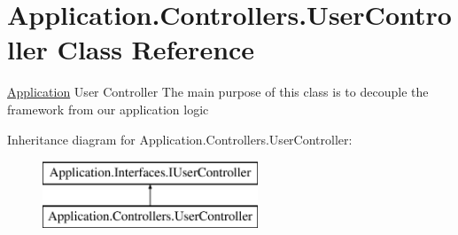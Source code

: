 \hypertarget{class_application_1_1_controllers_1_1_user_controller}{}\section{Application.\+Controllers.\+User\+Controller Class Reference}
\label{class_application_1_1_controllers_1_1_user_controller}


\mbox{\hyperlink{namespace_application}{Application}} User Controller The main purpose of this class is to decouple the framework from our application logic  


Inheritance diagram for Application.\+Controllers.\+User\+Controller\+:\begin{figure}[H]
\begin{center}
\leavevmode
\includegraphics[height=2.000000cm]{class_application_1_1_controllers_1_1_user_controller}
\end{center}
\end{figure}
